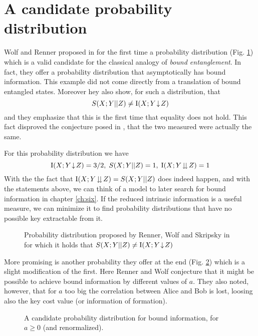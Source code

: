 \section{A candidate probability distribution}\label{daproblem}
    Wolf and Renner proposed in \cite{RW03} for the first time a probability distribution (Fig. \ref{Tab:candidate}) which is a valid candidate for the classical analogy of \emph{bound entanglement}. 
    In fact, they offer a probability distribution that asymptotically has bound information. 
    This example did not come directly from a translation of bound entangled states.
    Moreover hey also show, for such a distribution, that 
    \begin{equation}
    	S(X;Y||Z) \neq \operatorname{I}(X;Y\!\downarrow\!Z)
    \end{equation}  
     and they emphasize that this is the first time that equality does not hold. This fact disproved the conjecture posed in \cite{MW99}, that the two measured were actually the same.
     
     For this probability distribution we have
	$$ \operatorname{I}(X;Y\!\downarrow\!Z) = 3/2 ,\; S(X;Y||Z) = 1 , \; \operatorname{I}(X;Y\!\downdownarrows\!Z) = 1 $$
	With the the fact that $\operatorname{I}(X;Y\!\downdownarrows\!Z) = S(X;Y||Z)$ does indeed happen, and with the statements above, we can think of a model to later search for bound information in chapter \ref{ch:six}. 
	If the reduced intrinsic information is a useful measure, we can minimize it to find probability distributions that have no possible key extractable from it.
     
	\begin{figure}
		
	    \caption{Probability distribution proposed by Renner, Wolf and Skripsky in \cite{RW03} for which it holds that $S(X;Y||Z) \neq \operatorname{I}(X;Y\!\downarrow\!Z)$}
	    \label{Tab:candidate}
	\end{figure}	 
	
	More promising is another probability they offer at the end (Fig. \ref{Tab:candidate2}) which is a slight modification of the first. 
	Here Renner and Wolf conjecture that it might be possible to achieve bound information by different values of $a$. 
	They also noted, however, that for $a$ too big the correlation between Alice and Bob is lost, loosing also the key cost value (or information of formation).
	
	
	\begin{figure}
		
	    	
	    	\caption{A candidate probability distribution for bound information, for $a\geq 0$ (and renormalized).}
	    	\label{Tab:candidate2}
	\end{figure}
    